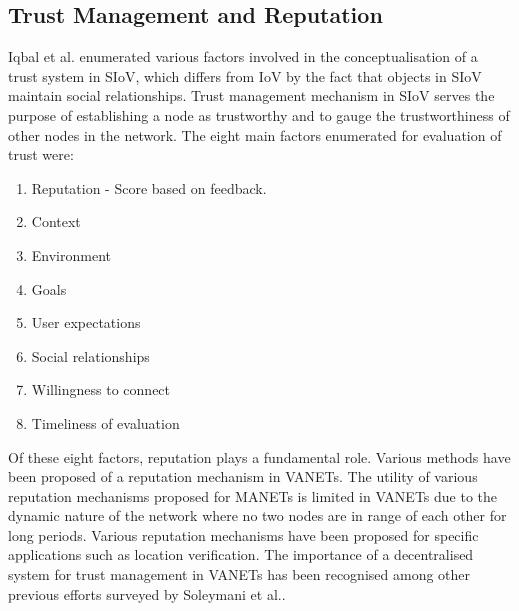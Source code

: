\documentclass[journal]{IEEEtran}
\begin{document}
\subsection{Trust Management and Reputation}
\label{sec:RV:trust&Reputation}
Iqbal et al. \cite{c:trustInSIoV} enumerated various factors involved in the conceptualisation of a trust system in SIoV, which differs from IoV by the fact that objects in SIoV maintain social relationships. Trust management mechanism in SIoV serves the purpose of establishing a node as trustworthy and to gauge the trustworthiness of other nodes in the network. The eight main factors enumerated for evaluation of trust were:\\
	\begin{enumerate}
		\item Reputation - Score based on feedback.
		\item Context
		\item Environment
		\item Goals
		\item User expectations
		\item Social relationships
		\item Willingness to connect
		\item Timeliness of evaluation 
	\end{enumerate}
Of these eight factors, reputation plays a fundamental role. Various methods have been proposed of a reputation mechanism in VANETs. The utility of various reputation mechanisms proposed for MANETs is limited in VANETs due to the dynamic nature of the network where no two nodes are in range of each other for long periods. Various reputation mechanisms have been proposed for specific applications such as location verification\cite{c:positionVerificationRepMech}. The importance of a decentralised system for trust management in VANETs\cite{c:Huang_decentrTrustMechVANETS} has been recognised among other previous efforts surveyed by Soleymani et al.\cite{c:trustinVANETsurvey}.
\end{document}
